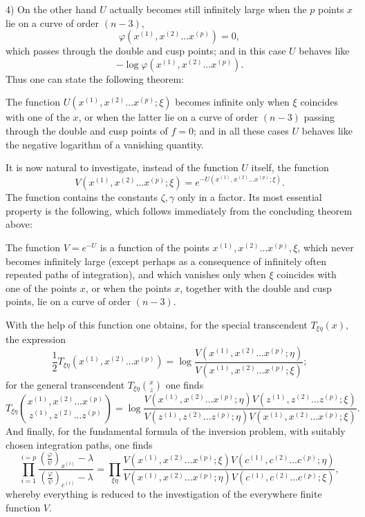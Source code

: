 \documentclass[10pt]{article}
\begin{document}
4) On the other hand \(U\) actually becomes still infinitely large when the \(p\) points \(x\) lie on a curve of order \((n-3)\),
\[
\varphi(x^{(1)},x^{(2)}\ldots x^{(p)})=0,
\]
which passes through the double and cusp points; and in this case \(U\) behaves like
\[
-\log\varphi(x^{(1)},x^{(2)}\ldots x^{(p)}).
\]
Thus one can state the following theorem:

The function \(U(x^{(1)},x^{(2)}\ldots x^{(p)};\xi)\) becomes infinite only when \(\xi\) coincides with one of the \(x\), or when the latter lie on a curve of order \((n-3)\) passing through the double and cusp points of \(f=0\); and in all these cases \(U\) behaves like the negative logarithm of a vanishing quantity.

It is now natural to investigate, instead of the function \(U\) itself, the function
\[
V(x^{(1)},x^{(2)}\ldots x^{(p)};\xi)=e^{-U(x^{(1)},x^{(2)}\ldots x^{(p)};\xi)}.
\]
The function contains the constants \(\zeta,\gamma\) only in a factor. Its most essential property is the following, which follows immediately from the concluding theorem above:

The function \(V=e^{-U}\) is a function of the points \(x^{(1)},x^{(2)}\ldots x^{(p)},\xi\), which never becomes infinitely large (except perhaps as a consequence of infinitely often repeated paths of integration), and which vanishes only when \(\xi\) coincides with one of the points \(x\), or when the points \(x\), together with the double and cusp points, lie on a curve of order \((n-3)\).

With the help of this function one obtains, for the special transcendent \(T_{\xi\eta}(x)\), the expression
\[
\frac12T_{\xi\eta}(x^{(1)},x^{(2)}\ldots x^{(p)})
=\log\frac{V(x^{(1)},x^{(2)}\ldots x^{(p)};\eta)}{V(x^{(1)},x^{(2)}\ldots x^{(p)};\xi)};
\]
for the general transcendent \(T_{\xi\eta}\binom{x}{z}\) one finds
\[
T_{\xi\eta}\binom{x^{(1)},x^{(2)}\ldots x^{(p)}}{z^{(1)},z^{(2)}\ldots z^{(p)}}
=\log\frac{V(x^{(1)},x^{(2)}\ldots x^{(p)};\eta)V(z^{(1)},z^{(2)}\ldots z^{(p)};\xi)}{V(z^{(1)},z^{(2)}\ldots z^{(p)};\eta)V(x^{(1)},x^{(2)}\ldots x^{(p)};\xi)}.
\]
And finally, for the fundamental formula of the inversion problem, with suitably chosen integration paths, one finds
\begingroup\small
\[
\prod_{i=1}^{i=p}\frac{\left(\frac{\varphi}{\psi}\right)_{x^{(i)}}-\lambda}{\left(\frac{\varphi}{\psi}\right)_{c^{(i)}}-\lambda}
=\prod_{\xi\eta}\frac{V(x^{(1)},x^{(2)}\ldots x^{(p)};\xi)V(c^{(1)},c^{(2)}\ldots c^{(p)};\eta)}{V(x^{(1)},x^{(2)}\ldots x^{(p)};\eta)V(c^{(1)},c^{(2)}\ldots c^{(p)};\xi)},
\]
\endgroup
whereby everything is reduced to the investigation of the everywhere finite function \(V\).
\end{document}
